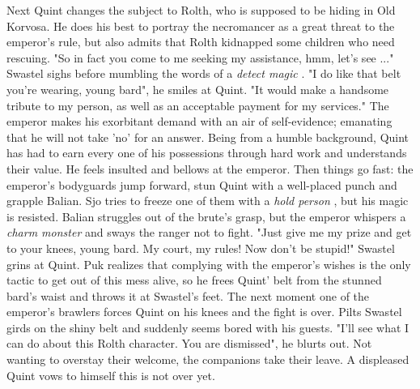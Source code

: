 Next Quint changes the subject to Rolth, who is supposed to be hiding in Old Korvosa. He does his best to portray the necromancer as a great threat to the emperor's rule, but also admits that Rolth kidnapped some children who need rescuing. "So in fact you come to me seeking my assistance, hmm, let's see ..." Swastel sighs before mumbling the words of a {\itshape detect magic} . "I do like that belt you're wearing, young bard", he smiles at Quint. "It would make a handsome tribute to my person, as well as an acceptable payment for my services." The emperor makes his exorbitant demand with an air of self-evidence; emanating that he will not take 'no' for an answer. Being from a humble background, Quint has had to earn every one of his possessions through hard work and understands their value. He feels insulted and bellows at the emperor. Then things go fast: the emperor's bodyguards jump forward, stun Quint with a well-placed punch and grapple Balian. Sjo tries to freeze one of them with a  {\itshape hold person} , but his magic is resisted. Balian struggles out of the brute's grasp, but the emperor whispers a  {\itshape charm monster} and sways the ranger not to fight. "Just give me my prize and get to your knees, young bard. My court, my rules! Now don't be stupid!" Swastel grins at Quint. Puk realizes that complying with the emperor's wishes is the only tactic to get out of this mess alive, so he frees Quint' belt from the stunned bard's waist and throws it at Swastel's feet. The next moment one of the emperor's brawlers forces Quint on his knees and the fight is over. Pilts Swastel girds on the shiny belt and suddenly seems bored with his guests. "I'll see what I can do about this Rolth character. You are dismissed", he blurts out. Not wanting to overstay their welcome, the companions take their leave. A displeased Quint vows to himself this is not over yet. 